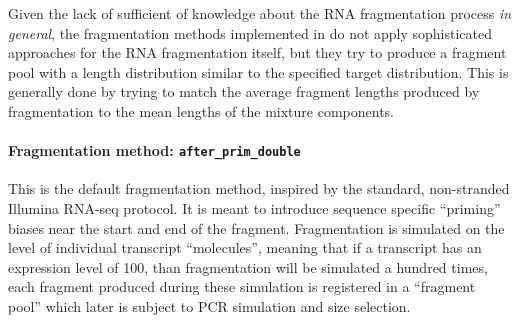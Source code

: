 
Given the lack of sufficient of knowledge about the RNA fragmentation process \emph{in general}, the fragmentation methods implemented in \rlsim do not apply sophisticated approaches for the RNA fragmentation itself, but they try to produce a fragment pool with a length distribution similar to the specified target distribution. This is generally done by trying to match the average fragment lengths produced by fragmentation to the mean lengths of the mixture components.  

\paragraph{{Fragmentation method: }\texttt{after\_prim\_double}}

This is the default fragmentation method, inspired by the standard, non-stranded Illumina RNA-seq protocol.
It is meant to introduce sequence specific ``priming'' biases near the start and end of the fragment.
Fragmentation is simulated on the level of individual transcript ``molecules'', meaning that if a transcript has an expression level of 100, than fragmentation will be simulated a hundred times, each fragment produced during these simulation is registered in a ``fragment pool'' which later is subject to PCR simulation and size selection.


